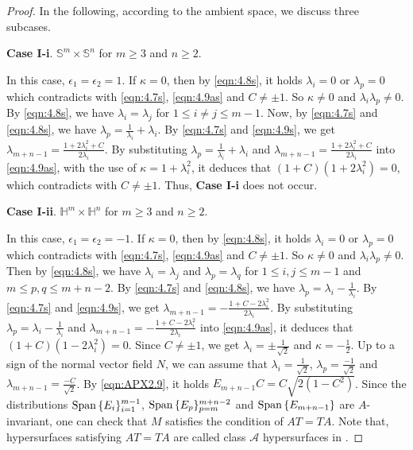 \documentclass[reqno]{amsart}%
\theoremstyle{definition}
\numberwithin{equation}{section}
\begin{document}
\begin{proof}
In the following, according to the ambient space, we discuss three subcases. 

{\bf Case I-i}. $\mathbb{S}^m\times\mathbb{S}^n$ for $m\geq3$ and $n\geq2$. 

In this case, $\epsilon_1=\epsilon_2=1$. If $\kappa=0$, then by \eqref{eqn:4.8s}, it holds 
$\lambda_i=0$ or $\lambda_p=0$ which contradicts with \eqref{eqn:4.7s}, \eqref{eqn:4.9as} 
and $C\neq\pm1$. 
So $\kappa\neq0$ and $\lambda_i\lambda_p\neq0$. By \eqref{eqn:4.8s}, we have 
$\lambda_i=\lambda_j$ for $1\leq i\neq j\leq m-1$.
Now, by \eqref{eqn:4.7s} and
\eqref{eqn:4.8s}, we have $\lambda_p=\tfrac{1}{\lambda_i}+\lambda_i$. By \eqref{eqn:4.7s} 
and \eqref{eqn:4.9s},
we get $\lambda_{m+n-1}=\tfrac{1+2\lambda_i^2+C}{2\lambda_i}$. By substituting $\lambda_p=\tfrac{1}{\lambda_i}+\lambda_i$ and  $\lambda_{m+n-1}=\tfrac{1+2\lambda_i^2+C}{2\lambda_i}$ into \eqref{eqn:4.9as}, with the use of  $\kappa=1+\lambda_i^2$, 
it deduces that $(1+C)(1+2\lambda_i^2)=0$, which contradicts with $C\neq\pm1$. 
Thus, {\bf Case I-i} does not occur. 

\vskip 2mm

{\bf Case I-ii}. $\mathbb{H}^m\times\mathbb{H}^n$ for $m\geq3$ and $n\geq2$. 

In this case, $\epsilon_1=\epsilon_2=-1$. 
If $\kappa=0$, then by \eqref{eqn:4.8s}, it holds 
$\lambda_i=0$ or $\lambda_p=0$ which contradicts with \eqref{eqn:4.7s}, \eqref{eqn:4.9as} 
and $C\neq\pm1$. 
So $\kappa\neq0$ and $\lambda_i\lambda_p\neq0$. 
Then by  \eqref{eqn:4.8s}, we have $\lambda_i=\lambda_j$ and $\lambda_p=\lambda_q$ for  $1\leq i,j\leq m-1$ and $m\leq p,q\leq m+n-2$. By \eqref{eqn:4.7s} and \eqref{eqn:4.8s}, we have $\lambda_{p}=\lambda_{i}-\frac{1}{\lambda_{i}}$. 
By \eqref{eqn:4.7s} and \eqref{eqn:4.9s}, we get  $\lambda_{m+n-1}=-\frac{1+C-2\lambda_i^2}{2\lambda_i}$. By substituting 
$\lambda_{p}=\lambda_{i}-\frac{1}{\lambda_{i}}$ and $\lambda_{m+n-1}=-\frac{1+C-2\lambda_i^2}{2\lambda_i}$ into 
\eqref{eqn:4.9as}, it deduces that  
$(1+C)(1-2\lambda_i^2)=0$. Since $C\neq\pm1$, we get $\lambda_i=\pm\frac{1}{\sqrt{2}}$ 
and $\kappa=-\frac{1}{2}$. 
Up to a sign of the normal vector field $N$, we can assume that 
$\lambda_i=\frac{1}{\sqrt{2}}$, $\lambda_p=\frac{-1}{\sqrt{2}}$ and 
$\lambda_{m+n-1}=\frac{-C}{\sqrt{2}}$.  By \eqref{eqn:APX2.9}, 
it holds $E_{m+n-1}C=C\sqrt{2(1-C^2)}$. 
Since the distributions ${\rm Span}\,\{E_i\}_{i=1}^{m-1}$, ${\rm Span}\,\{E_p\}_{p=m}^{m+n-2}$ and ${\rm Span}\,\{E_{m+n-1}\}$ are $A$-invariant, one can check that $M$ satisfies the condition of $AT=TA$. Note that, 
hypersurfaces satisfying $AT=TA$ are called class $\mathcal{A}$ hypersurfaces 
in \cite{CT}. 


\end{proof}
\end{document}
